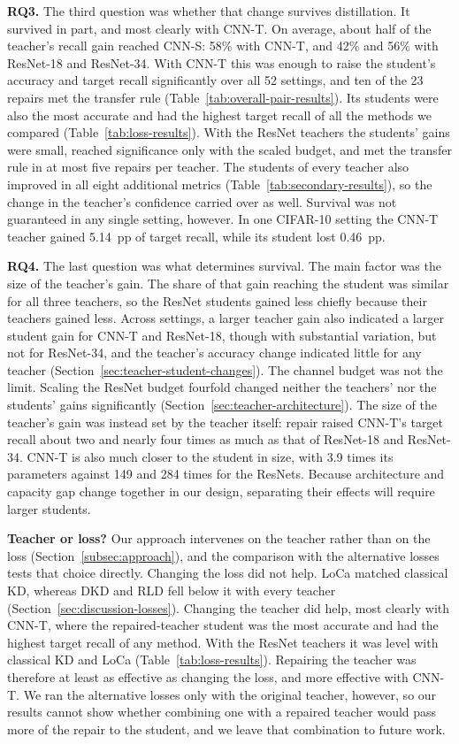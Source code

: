 \documentclass[review,number,sort&compress]{elsarticle}
\theoremstyle{definition}
\begin{document}
\textbf{RQ3.} The third question was whether that change survives
distillation. It survived in part, and most clearly with CNN-T. On
average, about half of the teacher's recall gain reached CNN-S: 58\%
with CNN-T, and 42\% and 56\% with ResNet-18 and ResNet-34. With CNN-T
this was enough to raise the student's accuracy and target recall
significantly over all 52 settings, and ten of the 23 repairs met the
transfer rule (Table~\ref{tab:overall-pair-results}). Its students were
also the most accurate and had the highest target recall of all the
methods we compared (Table~\ref{tab:loss-results}). With the ResNet
teachers the students' gains were small, reached significance only with
the scaled budget, and met the transfer rule in at most five repairs
per teacher. The students of every teacher also improved in all eight
additional metrics (Table~\ref{tab:secondary-results}), so the change
in the teacher's confidence carried over as well. Survival was not
guaranteed in any single setting, however. In one CIFAR-10 setting the
CNN-T teacher gained 5.14~pp of target recall, while its student lost
0.46~pp.

\textbf{RQ4.} The last question was what determines survival. The main
factor was the size of the teacher's gain. The share of that gain
reaching the student was similar for all three teachers, so the ResNet
students gained less chiefly because their teachers gained less. Across
settings, a larger teacher gain also indicated a larger student gain
for CNN-T and ResNet-18, though with substantial variation, but not for
ResNet-34, and the teacher's accuracy change indicated little for any
teacher (Section~\ref{sec:teacher-student-changes}). The channel budget
was not the limit. Scaling the ResNet budget fourfold changed neither
the teachers' nor the students' gains significantly
(Section~\ref{sec:teacher-architecture}). The size of the teacher's
gain was instead set by the teacher itself: repair raised CNN-T's target
recall about two and nearly four times as much as that of ResNet-18 and
ResNet-34. CNN-T is also much closer to the student in size, with 3.9
times its parameters against 149 and 284 times for the ResNets. Because
architecture and capacity gap change together in our design, separating
their effects will require larger students.

\textbf{Teacher or loss?} Our approach intervenes on the teacher rather
than on the loss (Section~\ref{subsec:approach}), and the comparison
with the alternative losses tests that choice directly. Changing the
loss did not help. LoCa matched classical KD, whereas DKD and RLD fell
below it with every teacher (Section~\ref{sec:discussion-losses}).
Changing the teacher did help, most clearly with CNN-T, where the
repaired-teacher student was the most accurate and had the highest
target recall of any method. With the ResNet teachers it was level with
classical KD and LoCa (Table~\ref{tab:loss-results}). Repairing the
teacher was therefore at least as effective as changing the loss, and
more effective with CNN-T. We ran the alternative losses only with the
original teacher, however, so our results cannot show whether combining
one with a repaired teacher would pass more of the repair to the
student, and we leave that combination to future work.
\end{document}
